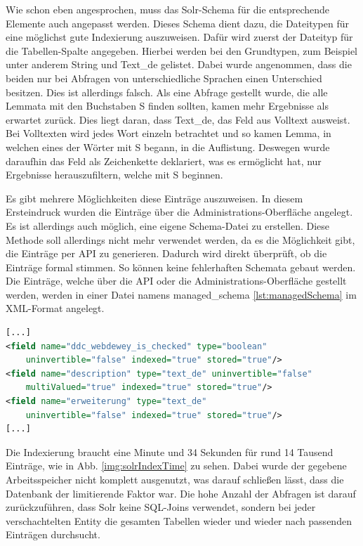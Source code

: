 Wie schon eben angesprochen, muss das Solr-Schema für die entsprechende Elemente auch angepasst werden. Dieses Schema dient dazu, die Dateitypen für eine möglichst gute Indexierung auszuweisen. Dafür wird zuerst der Dateityp für die Tabellen-Spalte angegeben. Hierbei werden bei den Grundtypen, zum Beispiel unter anderem String und Text\_de gelistet. Dabei wurde angenommen, dass die beiden nur bei Abfragen von unterschiedliche Sprachen einen Unterschied besitzen. Dies ist allerdings falsch. Als eine Abfrage gestellt wurde, die alle Lemmata mit den Buchstaben S finden sollten, kamen mehr Ergebnisse als erwartet zurück. Dies liegt daran, dass Text\_de, das Feld aus Volltext ausweist. 
Bei Volltexten wird jedes Wort einzeln betrachtet und so kamen Lemma, in welchen eines der Wörter mit S begann, in die Auflistung. Deswegen wurde daraufhin das Feld als Zeichenkette deklariert, was es ermöglicht hat, nur Ergebnisse herauszufiltern, welche mit S beginnen.

Es gibt mehrere Möglichkeiten diese Einträge auszuweisen. In diesem Ersteindruck wurden die Einträge über die Administrations-Oberfläche angelegt. Es ist allerdings auch möglich, eine eigene Schema-Datei zu erstellen. Diese Methode soll allerdings nicht mehr verwendet werden, da es die Möglichkeit gibt, die Einträge per API zu generieren. Dadurch wird direkt überprüft, ob die Einträge formal stimmen. So können keine fehlerhaften Schemata gebaut werden. Die Einträge, welche über die API oder die Administrations-Oberfläche gestellt werden, werden in einer Datei namens managed\_schema \ref{lst:managedSchema} im XML-Format angelegt. \cite{WrittenbytheApacheLuceneSolrProject.}


\begin{lstlisting}[language=xml, frame=single, label={lst:managedSchema}, 
    morekeywords={type,uninvertible,indexed,stored,field,multiValued, name},  caption=Auschnitt auf dem managed\_schema,captionpos=b] 
[...]
<field name="ddc_webdewey_is_checked" type="boolean" 
    uninvertible="false" indexed="true" stored="true"/>
<field name="description" type="text_de" uninvertible="false" 
    multiValued="true" indexed="true" stored="true"/>
<field name="erweiterung" type="text_de" 
    uninvertible="false" indexed="true" stored="true"/>
[...]
\end{lstlisting}

Die Indexierung braucht eine Minute und 34 Sekunden für rund 14 Tausend Einträge, wie in Abb. \ref{img:solrIndexTime} zu sehen. Dabei wurde der gegebene Arbeitsspeicher nicht komplett ausgenutzt, was darauf schließen lässt, dass die Datenbank der limitierende Faktor war. Die hohe Anzahl der Abfragen ist darauf zurückzuführen, dass Solr keine SQL-Joins verwendet, sondern bei jeder verschachtelten Entity die gesamten Tabellen wieder und wieder nach passenden Einträgen durchsucht.

